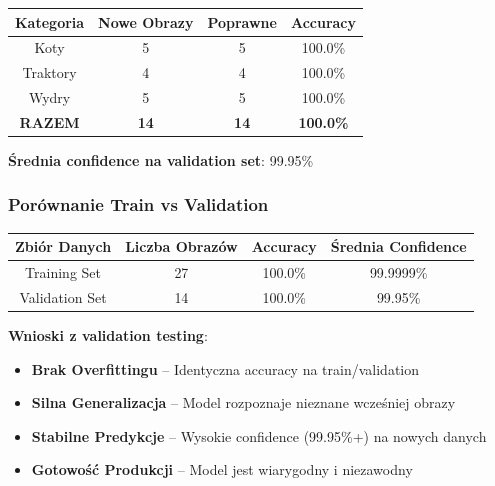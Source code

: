 \begin{table}[H]
	\centering
	\begin{tabular}{|c|c|c|c|}
		\hline
		\textbf{Kategoria} & \textbf{Nowe Obrazy} & \textbf{Poprawne} & \textbf{Accuracy} \\
		\hline
		Koty & 5 & 5 & 100.0\% \\
		Traktory & 4 & 4 & 100.0\% \\
		Wydry & 5 & 5 & 100.0\% \\
		\hline
		\textbf{RAZEM} & \textbf{14} & \textbf{14} & \textbf{100.0\%} \\
		\hline
	\end{tabular}
\end{table}

\textbf{Średnia confidence na validation set}: 99.95\%

\subsubsection{Porównanie Train vs Validation}

\begin{table}[H]
	\centering
	\begin{tabular}{|c|c|c|c|}
		\hline
		\textbf{Zbiór Danych} & \textbf{Liczba Obrazów} & \textbf{Accuracy} & \textbf{Średnia Confidence} \\
		\hline
		Training Set & 27 & 100.0\% & 99.9999\% \\
		Validation Set & 14 & 100.0\% & 99.95\% \\
		\hline
	\end{tabular}
\end{table}

\textbf{Wnioski z validation testing}:

\begin{itemize}
	\item \textbf{Brak Overfittingu} – Identyczna accuracy na train/validation
	\item  \textbf{Silna Generalizacja} – Model rozpoznaje nieznane wcześniej obrazy
	\item  \textbf{Stabilne Predykcje} – Wysokie confidence (99.95\%+) na nowych danych
	\item  \textbf{Gotowość Produkcji} – Model jest wiarygodny i niezawodny
\end{itemize}
